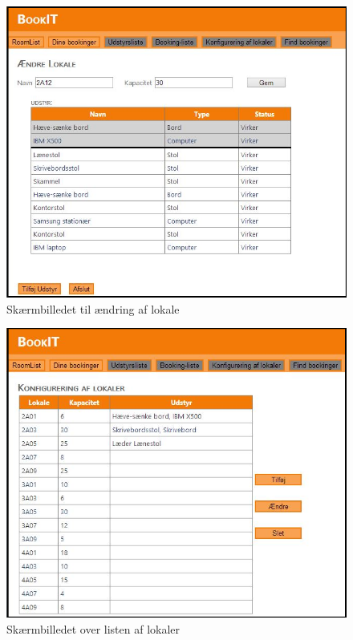 \begin{figure}[h!]
  \centering
    \includegraphics[width=\textwidth]{Appendix/GUI-Prototype/DigitalMockup/AendreLokale}
  \caption{Skærmbilledet til ændring af lokale}
\label{App_GUI_final_AendreLokale}
\end{figure}

\begin{figure}[h!]
  \centering
    \includegraphics[width=\textwidth]{Appendix/GUI-Prototype/DigitalMockup/LokaleListe}
  \caption{Skærmbilledet over listen af lokaler}
\label{App_GUI_final_LokaleListe}
\end{figure}